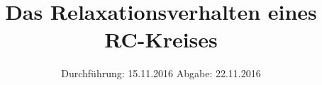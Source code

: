 

\subject{V353}
\title{Das Relaxationsverhalten eines RC-Kreises}
\date{
	Durchführung: 15.11.2016
	\hspace{4em}
	Abgabe: 22.11.2016
}


	\maketitle
	\newpage
	\tableofcontents
	\newpage
	
	
	
	
	
	
	\newpage
	
	\printbibliography

